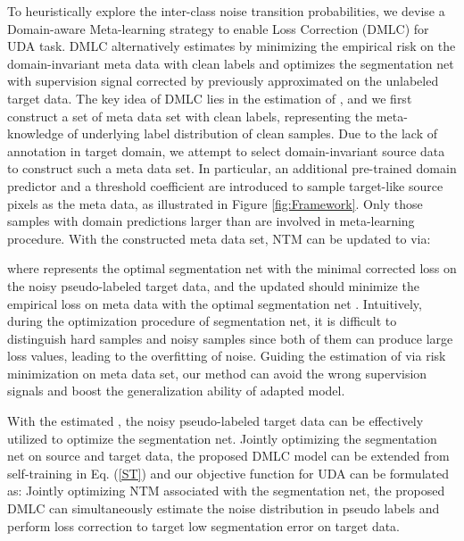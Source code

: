 \documentclass[final]{cvpr}
\begin{document}
To heuristically explore the inter-class noise transition probabilities, we devise a Domain-aware Meta-learning strategy to enable Loss Correction (DMLC) for UDA task. DMLC alternatively estimates  by minimizing the empirical risk on the domain-invariant meta data with clean labels and optimizes the segmentation net with supervision signal corrected by previously approximated  on the unlabeled target data. The key idea of DMLC lies in the estimation of , and we first construct a set of meta data set  with clean labels, representing the meta-knowledge of underlying label distribution of clean samples. Due to the lack of annotation in target domain, we attempt to select domain-invariant source data to construct such a meta data set. In particular, an additional pre-trained domain predictor  and a threshold coefficient  are introduced to sample target-like source pixels as the meta data, as illustrated in Figure \ref{fig:Framework}. Only those samples with domain predictions  larger than  are involved in meta-learning procedure. With the constructed meta data set, NTM can be updated to  via:

\vspace{-0.4cm}
\begin{small}

\end{small}where  represents the optimal segmentation net with the minimal corrected loss on the noisy pseudo-labeled target data, and the updated  should minimize the empirical loss on meta data with the optimal segmentation net \cite{shu2019meta, shu2020meta, wang2020training}. Intuitively, during the optimization procedure of segmentation net, it is difficult to distinguish hard samples and noisy samples since both of them can produce large loss values, {leading to the overfitting of noise}. Guiding the estimation of  via risk minimization on meta data set, our method can avoid the wrong supervision signals and boost the generalization ability of adapted model. 

With the estimated , the noisy pseudo-labeled target data can be effectively utilized to optimize the segmentation net. Jointly optimizing the segmentation net on source and target data, the proposed DMLC model can be extended from self-training in Eq. (\ref{ST}) and our objective function for UDA can be formulated as: 
\vspace{-0.1cm}
Jointly optimizing NTM associated with the segmentation net, the proposed DMLC can simultaneously estimate the noise distribution in pseudo labels and perform loss correction to target low segmentation error on target data. 
\end{document}
